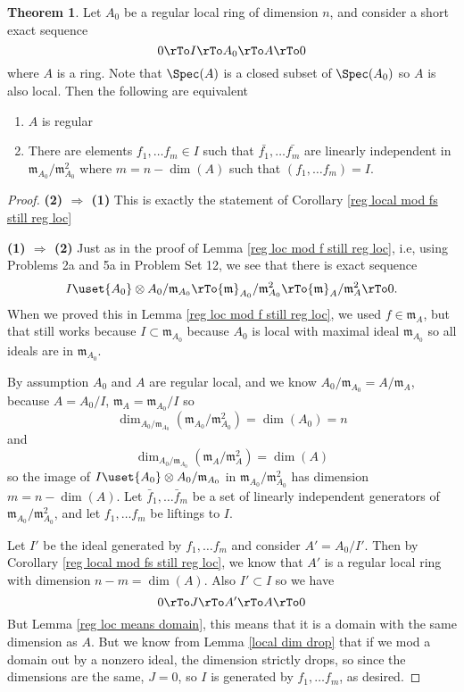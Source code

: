 \documentclass[12 pt]{article}
\theoremstyle{definition}
\newtheorem{thm}{Theorem}[section]
\renewcommand{\(}{\left(}
\renewcommand{\)}{\right)}
\newcommand\fm{{\mathfrak m}}
\begin{document}
\begin{thm} Let $A_0$ be a regular local ring of dimension $n$, and consider a short exact sequence
\[0 \rTo I \rTo A_0 \rTo A \rTo 0\]
where $A$ is a ring. Note that $\Spec(A)$ is a closed subset of $\Spec(A_0)$ so $A$ is also local. Then the following are equivalent
\begin{enumerate}
\item $A$ is regular
\item There are elements $f_1, \ldots f_m \in I$ such that $\bar{f_1}, \ldots \bar{f_m}$ are linearly independent in $\fm_{A_0}/\fm_{A_0}^2$ where $m=n-\dim(A)$ such that $(f_1, \ldots f_m)=I$.
\end{enumerate}
\label{reg loc main thm}
\end{thm}
\begin{proof} \textbf{(2) $\Rightarrow$ (1)} This is exactly the statement of Corollary \ref{reg local mod fs still reg loc}

\noindent \textbf{(1) $\Rightarrow$ (2)} Just as in the proof of Lemma \ref{reg loc mod f still reg loc}, i.e, using Problems 2a and 5a in Problem Set 12, we see that there is exact sequence
\[I \uset{A_0}\otimes A_0/\fm_{A_0} \rTo \fm_{A_0}/\fm_{A_0}^2 \rTo \fm_{A}/\fm_{A}^2  \rTo 0.\]
When we proved this in Lemma \ref{reg loc mod f still reg loc}, we used $f \in \fm_A$, but that still works because $I \subset \fm_{A_0}$ because $A_0$ is local with maximal ideal $\fm_{A_0}$ so all ideals are in $\fm_{A_0}$.

By assumption $A_0$ and $A$ are regular local, and we know $A_0/\fm_{A_0}=A/\fm_A$, because $A=A_0/I$, $\fm_A=\fm_{A_0}/I$ so
\[\dim_{A_0/\fm_{A_0}}(\fm_{A_0}/\fm_{A_0}^2)=\dim(A_0)=n\]
and
\[\dim_{A_0/\fm_{A_0}}(\fm_{A}/\fm_{A}^2)=\dim(A)\]
so the image of $I \uset{A_0}\otimes A_0/\fm_{A_0}$ in $\fm_{A_0}/\fm_{A_0}^2$ has dimension $m=n-\dim(A)$. Let $\bar{f}_1, \ldots \bar{f}_m$ be a set of linearly independent generators of $\fm_{A_0}/\fm_{A_0}^2$, and let $f_1, \ldots f_m$ be liftings to $I$.

Let $I'$ be the ideal generated by $f_1, \ldots f_m$ and consider $A'=A_0/I'$. Then by Corollary \ref{reg local mod fs still reg loc}, we know that $A'$ is a regular local ring with dimension $n-m=\dim(A)$. Also $I' \subset I$ so we have
\[0 \rTo J \rTo A' \rTo A \rTo 0\]
But Lemma \ref{reg loc means domain}, this means that it is a domain with the same dimension as $A$. But we know from Lemma \ref{local dim drop} that if we mod a domain out by a nonzero ideal, the dimension strictly drops, so since the dimensions are the same, $J=0$, so $I$ is generated by $f_1, \ldots f_m$, as desired.

\end{proof}
\end{document}
